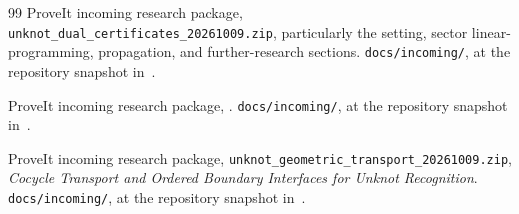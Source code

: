 \documentclass[11pt]{article}
\theoremstyle{definition}
\theoremstyle{remark}
\begin{document}
\begin{thebibliography}{99}
ProveIt incoming research package,
\texttt{unknot\_dual\_certificates\_20261009.zip}, particularly the setting,
sector linear-programming, propagation, and further-research sections.
\texttt{docs/incoming/}, at the repository snapshot in~\cite{repo}.

ProveIt incoming research package,
.
\texttt{docs/incoming/}, at the repository snapshot in~\cite{repo}.

ProveIt incoming research package,
\texttt{unknot\_geometric\_transport\_20261009.zip},
\emph{Cocycle Transport and Ordered Boundary Interfaces for Unknot Recognition}.
\texttt{docs/incoming/}, at the repository snapshot in~\cite{repo}.
\end{thebibliography}
\end{document}

